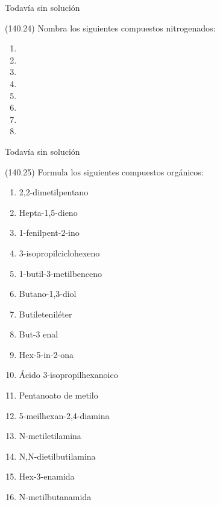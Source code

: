 \documentclass[10pt,a5paper,twoside]{article}
\begin{document}
  \begin{solution}[print=false]
    Todavía sin solución
  \end{solution}




  \begin{exercise}[
      tags    = {},
      topics  = {química, química orgánica, orgánica},
      source  = {FQ 1B MGH 2016, p140, e24},
    ]
    (140.24) Nombra los siguientes compuestos nitrogenados:
    \begin{enumerate}
      \item {}
      \item {}
      \item {}
      \item {}
      \item {}
      \item {}
      \item {}
      \item {}
    \end{enumerate}
  \end{exercise}

  \begin{solution}[print=false]
    Todavía sin solución
  \end{solution}




  \begin{exercise}[
      tags    = {},
      topics  = {química, química orgánica, orgánica},
      source  = {FQ 1B MGH 2016, p140, e25},
    ]
    (140.25) Formula los siguientes compuestos orgánicos:
    \begin{enumerate}
      \item 2,2-dimetilpentano
      \item Hepta-1,5-dieno
      \item 1-fenilpent-2-ino
      \item 3-isopropilciclohexeno
      \item 1-butil-3-metilbenceno
      \item Butano-1,3-diol
      \item Butileteniléter
      \item But-3 enal
      \item Hex-5-in-2-ona
      \item Ácido 3-isopropilhexanoico
      \item Pentanoato de metilo
      \item 5-meilhexan-2,4-diamina
      \item N-metiletilamina
      \item N,N-dietilbutilamina
      \item Hex-3-enamida
      \item N-metilbutanamida
    \end{enumerate}
  \end{exercise}
\end{document}
